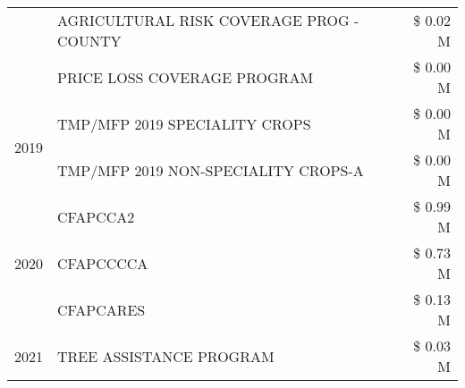 \begin{tabular}{llr}
 & AGRICULTURAL RISK COVERAGE PROG - COUNTY & \$ 0.02 M \\
 & PRICE LOSS COVERAGE PROGRAM & \$ 0.00 M \\
\cline{1-3}
\multirow[t]{2}{*}{2019} & TMP/MFP 2019 SPECIALITY CROPS & \$ 0.00 M \\
 & TMP/MFP 2019 NON-SPECIALITY CROPS-A & \$ 0.00 M \\
\cline{1-3}
\multirow[t]{3}{*}{2020} & CFAPCCA2 & \$ 0.99 M \\
 & CFAPCCCCA & \$ 0.73 M \\
 & CFAPCARES & \$ 0.13 M \\
\cline{1-3}
2021 & TREE ASSISTANCE PROGRAM & \$ 0.03 M \\
\cline{1-3}
\bottomrule
\end{tabular}
